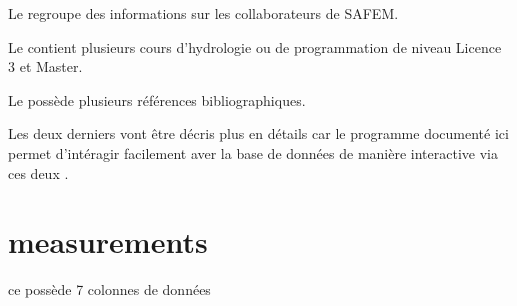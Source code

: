 \documentclass[letterpaper,10pt,french]{sphinxmanual}
\begin{document}
\sphinxAtStartPar
Le   regroupe des informations sur les collaborateurs de SAFE\sphinxhyphen{}M.

\sphinxAtStartPar
Le   contient plusieurs cours d’hydrologie ou de programmation de niveau Licence 3 et Master.

\sphinxAtStartPar
Le   possède plusieurs références bibliographiques.

\sphinxAtStartPar
Les deux derniers  vont être décris plus en détails car le programme documenté ici permet d’intéragir facilement aver la base de données
de manière interactive via ces deux .


\section{measurements}
\label{\detokenize{bones:measurements}}
\sphinxAtStartPar
ce  possède 7 colonnes de données
\end{document}
